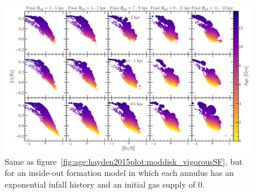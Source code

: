 \documentclass[12pt]{report}
\begin{document}
\begin{figure} 
\centering 
\includegraphics[scale = 0.3]{../plots/age/hayden2015plot/iodisk_reference.png} 
\caption{Same as figure~\ref{fig:age:hayden2015plot:moddisk_vigorousSF}, but 
for an inside-out formation model in which each annulus has an exponential 
infall history and an initial gas supply of 0. }
\end{figure} 
\end{document}
